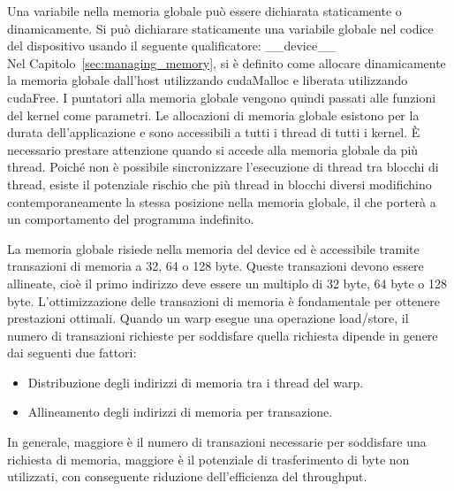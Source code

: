 Una variabile nella memoria globale può essere dichiarata staticamente o dinamicamente. Si può dichiarare staticamente una variabile globale nel codice del dispositivo usando il seguente qualificatore:
\_\_device\_\_\\

Nel Capitolo~\ref{sec:managing_memory}, si è definito come allocare dinamicamente la memoria globale dall'host utilizzando cudaMalloc e liberata utilizzando cudaFree. I puntatori alla memoria globale vengono quindi passati alle funzioni del kernel come parametri. Le allocazioni di memoria globale esistono per la durata dell'applicazione e sono accessibili a tutti i thread di tutti i kernel. È necessario prestare attenzione quando si accede alla memoria globale da più thread. Poiché non è possibile sincronizzare l'esecuzione di thread tra blocchi di thread, esiste il potenziale rischio che più thread in blocchi diversi modifichino contemporaneamente la stessa posizione nella memoria globale, il che porterà a un comportamento del programma indefinito.

La memoria globale risiede nella memoria del device ed è accessibile tramite transazioni di memoria a 32, 64 o 128 byte. Queste transazioni devono essere allineate, cioè il primo indirizzo deve essere un multiplo di 32 byte, 64 byte o 128 byte. L'ottimizzazione delle transazioni di memoria è fondamentale per ottenere prestazioni ottimali. Quando un warp esegue una operazione load/store, il numero di transazioni richieste per soddisfare quella richiesta dipende in genere dai seguenti due fattori:
\begin{itemize}
	\item Distribuzione degli indirizzi di memoria tra i thread del warp.
	\item Allineamento degli indirizzi di memoria per transazione.
\end{itemize}
In generale, maggiore è il numero di transazioni necessarie per soddisfare una richiesta di memoria, maggiore è il potenziale di trasferimento di byte non utilizzati, con conseguente riduzione dell'efficienza del throughput.